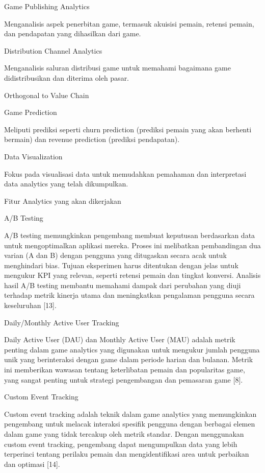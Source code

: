 Game Publishing Analytics

Menganalisis aspek penerbitan game, termasuk akuisisi pemain, retensi pemain, dan pendapatan yang dihasilkan dari game.

Distribution Channel Analytics

Menganalisis saluran distribusi game untuk memahami bagaimana game didistribusikan dan diterima oleh pasar.

Orthogonal to Value Chain

Game Prediction

Meliputi prediksi seperti churn prediction (prediksi pemain yang akan berhenti bermain) dan revenue prediction (prediksi pendapatan).

Data Visualization

Fokus pada visualisasi data untuk memudahkan pemahaman dan interpretasi data analytics yang telah dikumpulkan.

Fitur Analytics yang akan dikerjakan

A/B Testing

A/B testing memungkinkan pengembang membuat keputusan berdasarkan data untuk mengoptimalkan aplikasi mereka. Proses ini melibatkan pembandingan dua varian (A dan B) dengan pengguna yang ditugaskan secara acak untuk menghindari bias. Tujuan eksperimen harus ditentukan dengan jelas untuk mengukur KPI yang relevan, seperti retensi pemain dan tingkat konversi. Analisis hasil A/B testing membantu memahami dampak dari perubahan yang diuji terhadap metrik kinerja utama dan meningkatkan pengalaman pengguna secara keseluruhan [13].

Daily/Monthly Active User Tracking

Daily Active User (DAU) dan Monthly Active User (MAU) adalah metrik penting dalam game analytics yang digunakan untuk mengukur jumlah pengguna unik yang berinteraksi dengan game dalam periode harian dan bulanan. Metrik ini memberikan wawasan tentang keterlibatan pemain dan popularitas game, yang sangat penting untuk strategi pengembangan dan pemasaran game [8].

Custom Event Tracking

Custom event tracking adalah teknik dalam game analytics yang memungkinkan pengembang untuk melacak interaksi spesifik pengguna dengan berbagai elemen dalam game yang tidak tercakup oleh metrik standar. Dengan menggunakan custom event tracking, pengembang dapat mengumpulkan data yang lebih terperinci tentang perilaku pemain dan mengidentifikasi area untuk perbaikan dan optimasi [14].

